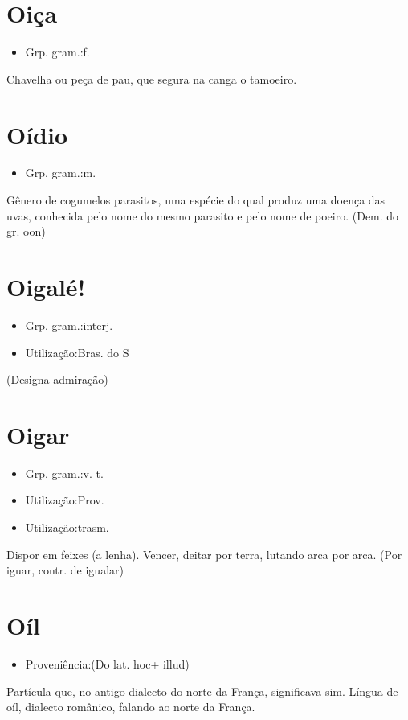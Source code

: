 \section{Oiça}
\begin{itemize}
\item {Grp. gram.:f.}
\end{itemize}
Chavelha ou peça de pau, que segura na canga o tamoeiro.
\section{Oídio}
\begin{itemize}
\item {Grp. gram.:m.}
\end{itemize}
Gênero de cogumelos parasitos, uma espécie do qual produz uma doença das uvas, conhecida pelo nome do mesmo parasito e pelo nome de \textunderscore poeiro\textunderscore .
(Dem. do gr. \textunderscore oon\textunderscore )
\section{Oigalé!}
\begin{itemize}
\item {Grp. gram.:interj.}
\end{itemize}
\begin{itemize}
\item {Utilização:Bras. do S}
\end{itemize}
(Designa \textunderscore admiração\textunderscore )
\section{Oigar}
\begin{itemize}
\item {Grp. gram.:v. t.}
\end{itemize}
\begin{itemize}
\item {Utilização:Prov.}
\end{itemize}
\begin{itemize}
\item {Utilização:trasm.}
\end{itemize}
Dispor em feixes (a lenha).
Vencer, deitar por terra, lutando arca por arca.
(Por \textunderscore iguar\textunderscore , contr. de \textunderscore igualar\textunderscore )
\section{Oíl}
\begin{itemize}
\item {Proveniência:(Do lat. \textunderscore hoc\textunderscore  + \textunderscore illud\textunderscore )}
\end{itemize}
Partícula que, no antigo dialecto do norte da França, significava \textunderscore sim\textunderscore .
\textunderscore Língua de oíl\textunderscore , dialecto românico, falando ao norte da França.
